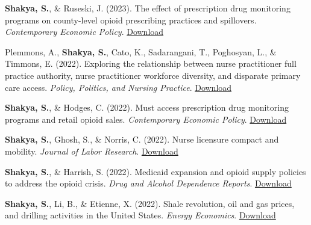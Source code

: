 \begin{etaremune}
\item \textbf{Shakya, S.}, \& Ruseski, J. (2023). The effect of prescription drug monitoring programs on county-level opioid prescribing practices and spillovers. \textit{Contemporary Economic Policy}. \hfill \href{https://www.dropbox.com/scl/fi/uwjo6pk4fvri714j9vgzc/Contemporary-Economic-Policy-2023-Shakya-The-effect-of-Prescription-Drug-Monitoring-Programs-on-county-level-opioid.pdf?rlkey=het575mm5mdsgi53gyljbjzok&dl=0}{Download}

\item Plemmons, A., \textbf{Shakya, S.}, Cato, K., Sadarangani, T., Poghosyan, L., \& Timmons, E. (2022). Exploring the relationship between nurse practitioner full practice authority, nurse practitioner workforce diversity, and disparate primary care access. \textit{Policy, Politics, and Nursing Practice}. \hfill \href{https://www.dropbox.com/scl/fi/vtfnitm93hofjjdzg95yi/Exploring-the-Relationship-between-Nurse-Practitioner-Full-Practice-Authority-Nurse-Practitioner-Workforce-Diversity-and-Disparate-Primary-Care-Access.pdf?rlkey=716aejw18by42z96qx1qoq3sd&dl=0}{Download}

\item \textbf{Shakya, S.}, \& Hodges, C. (2022). Must access prescription drug monitoring programs and retail opioid sales. \textit{Contemporary Economic Policy}. \hfill \href{https://www.dropbox.com/scl/fi/d2yash55gkz0j8wvkn61o/Contemporary-Economic-Policy-2022-Shakya-Must-access-prescription-drug-monitoring-programs-and-retail-opioid-sales.pdf?rlkey=zno0w3llwq2i5kz1ioivdrogo&dl=0}{Download}

\item \textbf{Shakya, S.}, Ghosh, S., \& Norris, C. (2022). Nurse licensure compact and mobility. \textit{Journal of Labor Research}. \hfill \href{https://www.dropbox.com/scl/fi/wfiwi8em9sbat5u9fcau2/Nurse-Licensure-Compact-and-Mobility.pdf?rlkey=8oved5beoz93zlxvhfzkzxx9i&dl=0}{Download}

\item \textbf{Shakya, S.}, \& Harrish, S. (2022). Medicaid expansion and opioid supply policies to address the opioid crisis. \textit{Drug and Alcohol Dependence Reports}. \hfill \href{https://www.dropbox.com/scl/fi/7m3j494m07g6dbt9ct1mt/Medicaid-expansion-and-opioid-supply-policies-to-address-the-opioid-overdose-crisis.pdf?rlkey=2s7ealv7uoxfikvteas8kbi3g&dl=0}{Download}

\item \textbf{Shakya, S.}, Li, B., \& Etienne, X. (2022). Shale revolution, oil and gas prices, and drilling activities in the United States. \textit{Energy Economics}. \hfill \href{https://www.dropbox.com/scl/fi/o0yruunqmgeig96pqmlag/Shale-Revolution-Oil-and-Gas-Prices-and-Drilling-Activities-in.pdf?rlkey=2fxzwf5jagb8nwrfnue414eqr&dl=0}{Download}


\end{etaremune}
